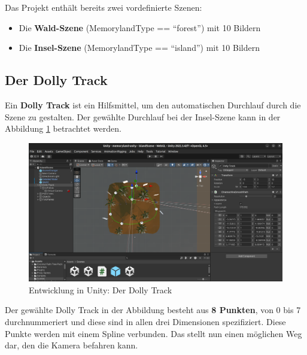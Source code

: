 Das Projekt enthält bereits zwei vordefinierte Szenen:

\begin{itemize}
    \item Die \textbf{Wald-Szene} (MemorylandType == ``forest'') mit 10 Bildern
    \item Die \textbf{Insel-Szene} (MemorylandType == ``island'') mit 10 Bildern
\end{itemize}


\subsection{Der Dolly Track}
\label{subsec:unity-dolly-track}

Ein \textbf{Dolly Track} ist ein Hilfsmittel, um den automatischen Durchlauf durch die Szene zu gestalten. Der gewählte Durchlauf bei der Insel-Szene kann in der Abbildung \ref{fig:unity-dolly-track} betrachtet werden.


\begin{figure} [h t]
    \centering
    \includegraphics[scale=0.15]{pics/unity-dolly-track.png}
    \caption{Entwicklung in Unity: Der Dolly Track}
    \label{fig:unity-dolly-track}
\end{figure}

Der gewählte Dolly Track in der Abbildung besteht aus \textbf{8 Punkten}, von 0 bis 7 durchnummeriert und diese sind in allen drei Dimensionen spezifiziert. Diese Punkte werden mit einem Spline verbunden. Das stellt nun einen möglichen Weg dar, den die Kamera befahren kann. 


